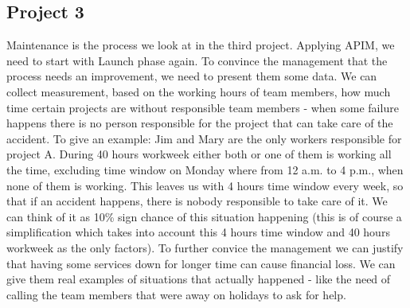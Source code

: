 \subsection*{Project 3}

Maintenance is the process we look at in the third project. Applying APIM, we need to start with Launch phase again. To convince the management that the process needs an improvement, we need to present them some data. We can collect measurement, based on the working hours of team members, how much time certain projects are without responsible team members - when some failure happens there is no person responsible for the project that can take care of the accident. To give an example: Jim and Mary are the only workers responsible for project A. During 40 hours workweek either both or one of them is working all the time, excluding time window on Monday where from 12 a.m. to 4 p.m., when none of them is working. This leaves us with 4 hours time window every week, so that if an accident happens, there is nobody responsible to take care of it. We can think of it as 10\% sign chance of this situation happening (this is of course a simplification which takes into account this 4 hours time window and 40 hours workweek as the only factors). To further convice the management we can justify that having some services down for longer time can cause financial loss. We can give them real examples of situations that actually happened - like the need of calling the team members that were away on holidays to ask for help.

